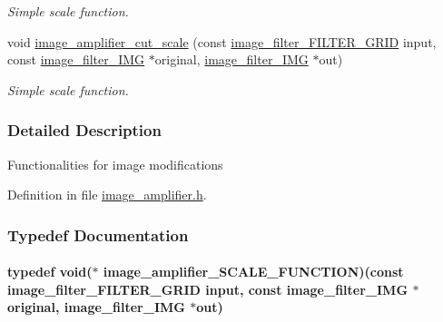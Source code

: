 \begin{DoxyCompactItemize}
\begin{DoxyCompactList}\small\item\em Simple scale function. \end{DoxyCompactList}\item 
void \hyperlink{a00011_a8fa267e3b217e8fdb4d4b952188f5d7c}{image\-\_\-amplifier\-\_\-cut\-\_\-scale} (const \hyperlink{a00012_a3d41ec3c203c47ad7dec21ff55acc883}{image\-\_\-filter\-\_\-\-F\-I\-L\-T\-E\-R\-\_\-\-G\-R\-I\-D} input, const \hyperlink{a00004}{image\-\_\-filter\-\_\-\-I\-M\-G} $\ast$original, \hyperlink{a00004}{image\-\_\-filter\-\_\-\-I\-M\-G} $\ast$out)
\begin{DoxyCompactList}\small\item\em Simple scale function. \end{DoxyCompactList}\end{DoxyCompactItemize}


\subsubsection{Detailed Description}
Functionalities for image modifications 

Definition in file \hyperlink{a00011_source}{image\-\_\-amplifier.\-h}.



\subsubsection{Typedef Documentation}
\hypertarget{a00011_a1ea386c90cd9638e2f2576d348eb122f}{
\paragraph[{image\-\_\-amplifier\-\_\-\-S\-C\-A\-L\-E\-\_\-\-F\-U\-N\-C\-T\-I\-O\-N}]{\setlength{\rightskip}{0pt plus 5cm}typedef void($\ast$ image\-\_\-amplifier\-\_\-\-S\-C\-A\-L\-E\-\_\-\-F\-U\-N\-C\-T\-I\-O\-N)(const {\bf image\-\_\-filter\-\_\-\-F\-I\-L\-T\-E\-R\-\_\-\-G\-R\-I\-D} input, const {\bf image\-\_\-filter\-\_\-\-I\-M\-G} $\ast$original, {\bf image\-\_\-filter\-\_\-\-I\-M\-G} $\ast$out)}}\label{a00011_a1ea386c90cd9638e2f2576d348eb122f}


